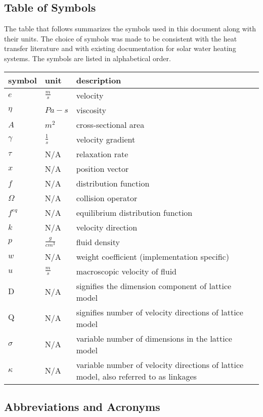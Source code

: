 \documentclass[12pt]{article}
\begin{document}
\subsection{Table of Symbols}

The table that follows summarizes the symbols used in this document along with
their units.  The choice of symbols was made to be consistent with the heat
transfer literature and with existing documentation for solar water heating
systems.  The symbols are listed in alphabetical order.

\renewcommand{\arraystretch}{1.2}
\noindent \begin{longtable*}{l l p{12cm}} \toprule
\textbf{symbol} & \textbf{unit} & \textbf{description}\\
\midrule 
$e$ & $\frac{m}{s}$ & velocity
\\
$\eta$ & $Pa-s$ & viscosity
\\ 
$A$ & $m^2$ & cross-sectional area
\\
$\gamma$ & $\frac{1}{s}$ & velocity gradient
\\
$\tau$ & N/A & relaxation rate
\\
$x$ & N/A & position vector
\\
$f$ & N/A & distribution function
\\
$\Omega$ & N/A & collision operator
\\
$f^{eq}$ & N/A & equilibrium distribution function
\\
$k$ & N/A & velocity direction
\\
$p$ & $\frac{g}{cm^3}$ & fluid density
\\
$w$ & N/A & weight coefficient (implementation specific)
\\
$u$ & $\frac{m}{s}$ & macroscopic velocity of fluid
\\
$\mathrm{D}$ & N/A & signifies the dimension component of lattice model
\\
$\mathrm{Q}$ & N/A & signifies number of velocity directions of lattice model
\\
$\sigma$ & N/A & variable number of dimensions in the lattice model
\\
$\kappa$ & N/A & variable number of velocity directions of lattice model, also referred to as linkages
\\
\bottomrule
\end{longtable*}

\subsection{Abbreviations and Acronyms}
\end{document}
